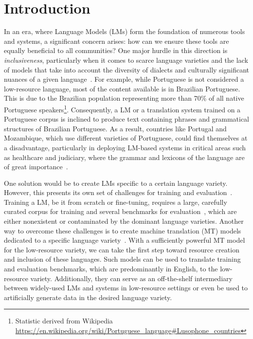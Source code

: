 
\section{Introduction}

In an era, where Language Models (LMs) form the foundation of numerous tools and systems, a significant concern arises: how can we ensure these tools are equally beneficial to all communities? One major hurdle in this direction is \emph{inclusiveness}, particularly when it comes to scarce language varieties and the lack of models that take into account the diversity of dialects and culturally significant nuances of a given language~\cite{CostaJussa2018}. 
For example, while Portuguese is not considered a low-resource language, most of the content available is in Brazilian Portuguese. 
This is due to the Brazilian population representing more than 70\% of all native Portuguese speakers\footnote{Statistic derived from Wikipedia \url{https://en.wikipedia.org/wiki/Portuguese_language#Lusophone_countries}}. 
Consequently, a LM or a translation system trained on a Portuguese corpus is inclined to produce text containing phrases and grammatical structures of Brazilian Portuguese.  
As a result, countries like Portugal and Mozambique, which use different varieties of Portuguese, could find themselves at a disadvantage, particularly in deploying LM-based systems in critical areas such as healthcare and judiciary, where the grammar and lexicons of the language are of great importance~\cite{Scherre2016, Kato2016, Brito2016}.


One solution would be to create LMs specific to a certain language variety. However, this presents its own set of challenges for training and evaluation~\cite{ArmengolEstape2021,Rodrigues2023}. 
Training a LM, be it from scratch or fine-tuning,  requires a large, carefully curated corpus for training and several benchmarks for evaluation~\cite{Albalak2024}, which are either nonexistent or contaminated by the dominant language varieties. 
Another way to overcome these challenges is to create machine translation (MT) models dedicated to a specific language variety~\cite{Zbib2012, Sennrich2016, Riley2023}. 
With a sufficiently powerful MT model for the low-resource variety, we can take the first step toward resource creation and inclusion of these languages.
Such models can be used to translate training and evaluation benchmarks, which are predominantly in English, to the low-resource variety. 
Additionally, they can serve as an off-the-shelf intermediary between widely-used LMs and systems in low-resource settings or even be used to artificially generate data in the desired language variety. 


